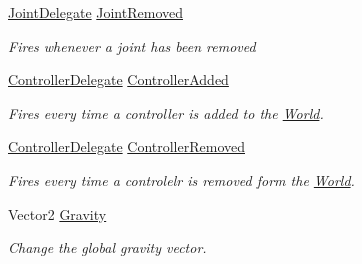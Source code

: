 \begin{DoxyCompactItemize}
\hyperlink{namespace_farseer_physics_1_1_dynamics_a9da8e70b5e8c9bde4473fcf8e47d0fb1}{Joint\+Delegate} \hyperlink{class_farseer_physics_1_1_dynamics_1_1_world_a9427c555e5dd76cad2e4a534c87536ca}{Joint\+Removed}
\begin{DoxyCompactList}\small\item\em Fires whenever a joint has been removed \end{DoxyCompactList}\item 
\hyperlink{namespace_farseer_physics_1_1_dynamics_a3eb71c1aad910dfe002a3500cc678c0b}{Controller\+Delegate} \hyperlink{class_farseer_physics_1_1_dynamics_1_1_world_a6e9d7ed36e299314099adbb9fcf5bcf6}{Controller\+Added}
\begin{DoxyCompactList}\small\item\em Fires every time a controller is added to the \hyperlink{class_farseer_physics_1_1_dynamics_1_1_world}{World}. \end{DoxyCompactList}\item 
\hyperlink{namespace_farseer_physics_1_1_dynamics_a3eb71c1aad910dfe002a3500cc678c0b}{Controller\+Delegate} \hyperlink{class_farseer_physics_1_1_dynamics_1_1_world_afec12857abc9ff2a5ecad21f984460e9}{Controller\+Removed}
\begin{DoxyCompactList}\small\item\em Fires every time a controlelr is removed form the \hyperlink{class_farseer_physics_1_1_dynamics_1_1_world}{World}. \end{DoxyCompactList}\item 
Vector2 \hyperlink{class_farseer_physics_1_1_dynamics_1_1_world_aed9ddcd16f6b9b7d96b332e0cdb1d6bc}{Gravity}
\begin{DoxyCompactList}\small\item\em Change the global gravity vector. \end{DoxyCompactList}\end{DoxyCompactItemize}
